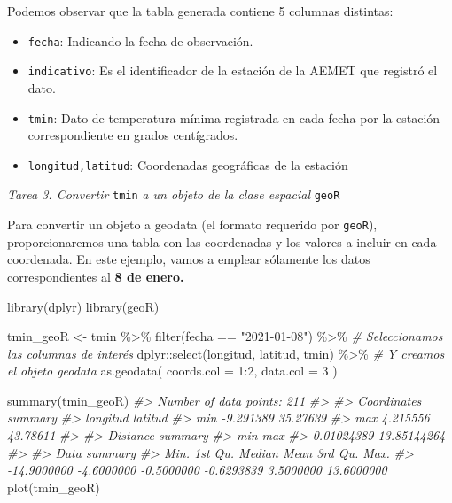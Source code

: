 \documentclass[
]{book}
\newenvironment{Shaded}{\begin{snugshade}}{\end{snugshade}}
\newcommand{\AttributeTok}[1]{\textcolor[rgb]{0.77,0.63,0.00}{#1}}
\newcommand{\CommentTok}[1]{\textcolor[rgb]{0.56,0.35,0.01}{\textit{#1}}}
\newcommand{\DecValTok}[1]{\textcolor[rgb]{0.00,0.00,0.81}{#1}}
\newcommand{\FunctionTok}[1]{\textcolor[rgb]{0.00,0.00,0.00}{#1}}
\newcommand{\NormalTok}[1]{#1}
\newcommand{\OtherTok}[1]{\textcolor[rgb]{0.56,0.35,0.01}{#1}}
\newcommand{\SpecialCharTok}[1]{\textcolor[rgb]{0.00,0.00,0.00}{#1}}
\newcommand{\StringTok}[1]{\textcolor[rgb]{0.31,0.60,0.02}{#1}}
\begin{document}
Podemos observar que la tabla generada contiene 5 columnas distintas:

\begin{itemize}
\item
  \texttt{fecha}: Indicando la fecha de observación.
\item
  \texttt{indicativo}: Es el identificador de la estación de la AEMET que registró el
  dato.
\item
  \texttt{tmin}: Dato de temperatura mínima registrada en cada fecha por la estación
  correspondiente en grados centígrados.
\item
  \texttt{longitud,latitud}: Coordenadas geográficas de la estación
\end{itemize}

\emph{Tarea 3. Convertir} \texttt{tmin} \emph{a un objeto de la clase espacial} \texttt{geoR}

Para convertir un objeto a geodata (el formato requerido por \texttt{geoR}),
proporcionaremos una tabla con las coordenadas y los valores a incluir en cada
coordenada. En este ejemplo, vamos a emplear sólamente los datos
correspondientes al \textbf{8 de enero.}

\begin{Shaded}
\begin{Highlighting}[]
\FunctionTok{library}\NormalTok{(dplyr)}
\FunctionTok{library}\NormalTok{(geoR)}

\NormalTok{tmin\_geoR }\OtherTok{\textless{}{-}}\NormalTok{ tmin }\SpecialCharTok{\%\textgreater{}\%}
  \FunctionTok{filter}\NormalTok{(fecha }\SpecialCharTok{==} \StringTok{"2021{-}01{-}08"}\NormalTok{) }\SpecialCharTok{\%\textgreater{}\%}
  \CommentTok{\# Seleccionamos las columnas de interés}
\NormalTok{  dplyr}\SpecialCharTok{::}\FunctionTok{select}\NormalTok{(longitud, latitud, tmin) }\SpecialCharTok{\%\textgreater{}\%}
  \CommentTok{\# Y creamos el objeto geodata}
  \FunctionTok{as.geodata}\NormalTok{(}
    \AttributeTok{coords.col =} \DecValTok{1}\SpecialCharTok{:}\DecValTok{2}\NormalTok{,}
    \AttributeTok{data.col =} \DecValTok{3}
\NormalTok{  )}


\FunctionTok{summary}\NormalTok{(tmin\_geoR)}
\CommentTok{\#\textgreater{} Number of data points: 211 }
\CommentTok{\#\textgreater{} }
\CommentTok{\#\textgreater{} Coordinates summary}
\CommentTok{\#\textgreater{}      longitud  latitud}
\CommentTok{\#\textgreater{} min {-}9.291389 35.27639}
\CommentTok{\#\textgreater{} max  4.215556 43.78611}
\CommentTok{\#\textgreater{} }
\CommentTok{\#\textgreater{} Distance summary}
\CommentTok{\#\textgreater{}         min         max }
\CommentTok{\#\textgreater{}  0.01024389 13.85144264 }
\CommentTok{\#\textgreater{} }
\CommentTok{\#\textgreater{} Data summary}
\CommentTok{\#\textgreater{}        Min.     1st Qu.      Median        Mean     3rd Qu.        Max. }
\CommentTok{\#\textgreater{} {-}14.9000000  {-}4.6000000  {-}0.5000000  {-}0.6293839   3.5000000  13.6000000}
\FunctionTok{plot}\NormalTok{(tmin\_geoR)}
\end{Highlighting}
\end{Shaded}
\end{document}
